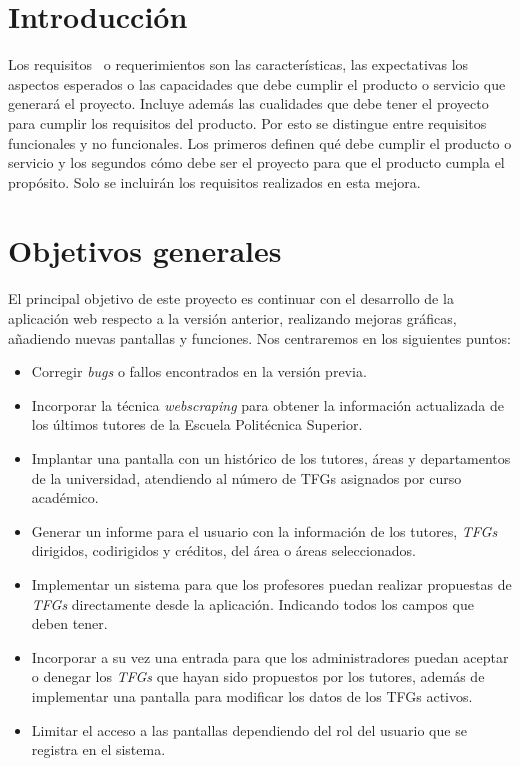 
\section{Introducción}

Los requisitos~\cite{Requisito} o requerimientos son las características, las expectativas los aspectos esperados o las capacidades que debe cumplir el producto o servicio que generará el proyecto. Incluye además las cualidades que debe tener el proyecto para cumplir los requisitos del producto. Por esto se distingue entre requisitos funcionales y no funcionales. Los primeros definen qué debe cumplir el producto o servicio y los segundos cómo debe ser el proyecto para que el producto cumpla el propósito.
Solo se incluirán los requisitos realizados en esta mejora.

\section{Objetivos generales}
El principal objetivo de este proyecto es continuar con el desarrollo de la aplicación web respecto a la versión anterior, realizando mejoras gráficas, añadiendo nuevas pantallas y funciones.
Nos centraremos en los siguientes puntos:
\begin{itemize}
	\item Corregir \emph{bugs} o fallos encontrados en la versión previa.
	\item Incorporar la técnica \emph{webscraping} para obtener la información actualizada de los últimos tutores de la Escuela Politécnica Superior.
	\item Implantar una pantalla con un histórico de los tutores, áreas y departamentos de la universidad, atendiendo al número de TFGs asignados por curso académico. 
	\item Generar un informe para el usuario con la información de los tutores, \emph{TFGs} dirigidos, codirigidos y créditos, del área o áreas seleccionados.
	\item Implementar un sistema para que los profesores puedan realizar propuestas de \emph{TFGs} directamente desde la aplicación. Indicando todos los campos que deben tener. 
	\item Incorporar a su vez una entrada para que los administradores puedan aceptar o denegar los \emph{TFGs} que hayan sido propuestos por los tutores, además de implementar una pantalla para modificar los datos de los TFGs activos.
	\item Limitar el acceso a las pantallas dependiendo del rol del usuario que se registra en el sistema.
\end{itemize}

